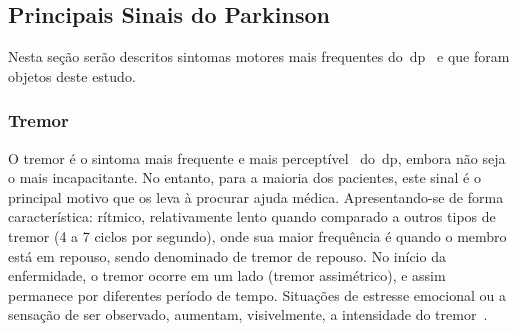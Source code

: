\subsection{Principais Sinais do Parkinson}
Nesta seção serão descritos sintomas motores mais frequentes do~\ac{dp}~\cite{protpar010} e que foram objetos deste estudo. %
%

\subsubsection{Tremor}\label{sec:tremor}
O tremor é o sintoma mais frequente e mais perceptível~\cite{limongi2002} do~\ac{dp}, embora não seja o mais incapacitante. No entanto, para a maioria dos pacientes, este sinal é o principal motivo que os leva à procurar ajuda médica. Apresentando-se de forma característica: rítmico, relativamente lento quando comparado a outros tipos de tremor (4 a 7 ciclos por segundo), onde sua maior frequência é quando o membro está em repouso, sendo denominado de tremor de repouso. No início da enfermidade, o tremor ocorre em um lado (tremor assimétrico), e assim permanece por diferentes período de tempo. Situações de estresse emocional ou a sensação de ser observado, aumentam, visivelmente, a intensidade do tremor~\cite{jankovic2008}. 

